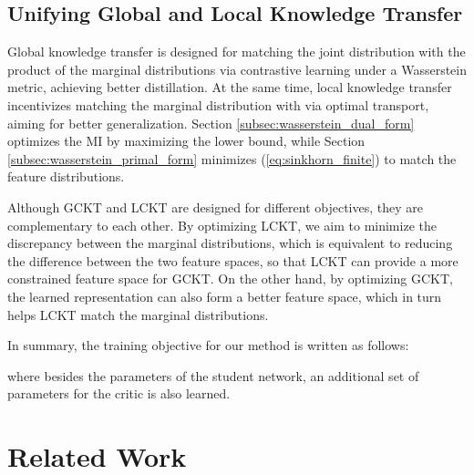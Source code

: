 \documentclass[final]{cvpr}
\theoremstyle{definition}
\begin{document}
\subsection{Unifying Global and Local Knowledge Transfer}

\label{sec:final_algorithm}
Global knowledge transfer is designed for matching the joint distribution  with the product of the marginal distributions  via contrastive learning under a Wasserstein metric, achieving better distillation.
At the same time, local knowledge transfer incentivizes matching the marginal distribution  with  via optimal transport, aiming for better generalization. 
Section \ref{subsec:wasserstein_dual_form} optimizes the MI by maximizing the lower bound, while Section \ref{subsec:wasserstein_primal_form} minimizes (\ref{eq:sinkhorn_finite}) to match the feature distributions.

Although GCKT and LCKT are designed for different objectives, they are complementary to each other. By optimizing LCKT, we aim to minimize the discrepancy between the marginal distributions, which is equivalent to reducing the difference between the two feature spaces, so that LCKT can provide a more constrained feature space for GCKT. On the other hand,
by optimizing GCKT, the learned representation can also form a better feature space, which in turn helps LCKT match the marginal distributions.

In summary, the training objective for our method is written as follows:

where besides the parameters  of the student network, an additional set of parameters  for the critic is also learned.











\section{Related Work}
\end{document}
